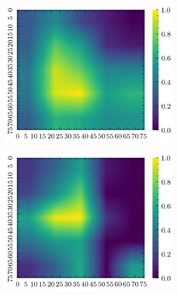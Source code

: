 \documentclass[../document.tex]{subfiles}
\begin{document}
\begin{figure}[H]
\begin{subfigure}[b]{0.19\textwidth}
        \includegraphics[width=\linewidth]{../img/5/quarry/false_negative/grad-cam-2d-2.png}
    \end{subfigure}
    \begin{subfigure}[b]{0.19\textwidth}
        \includegraphics[width=\linewidth]{../img/5/quarry/false_negative/grad-cam-2d-3.png}
    \end{subfigure}  
    \begin{subfigure}[b]{0.19\textwidth}

\end{subfigure}
\end{figure}
\end{document}
